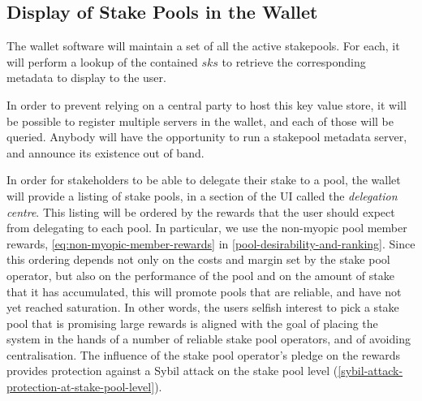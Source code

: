 \documentclass[11pt,a4paper]{article}
\begin{document}
\subsection{Display of Stake Pools in the Wallet}
\label{display-of-stake-pools-in-the-wallet}

The wallet software will maintain a set of all the active stakepools. For each,
it will perform a lookup of the contained \(sks\) to retrieve the corresponding
metadata to display to the user.

In order to prevent relying on a central party to host this key value
store, it will be possible to register multiple servers in the wallet,
and each of those will be queried. Anybody will have the opportunity to
run a stakepool metadata server, and announce its existence out of
band.

In order for stakeholders to be able to delegate their stake to a pool,
the wallet will provide a listing of stake pools, in a section of the UI
called the \emph{delegation centre}. This listing will be ordered by
the rewards that the user should expect from delegating to each pool. In
particular, we use the non-myopic pool member rewards,
\cref{eq:non-myopic-member-rewards} in \cref{pool-desirability-and-ranking}.
Since this ordering depends not only on the costs and margin set
by the stake pool operator, but also on the performance of the pool and
on the amount of stake that it has accumulated, this will promote pools
that are reliable, and have not yet reached saturation. In other words,
the users selfish interest to pick a stake pool that is promising large
rewards is aligned with the goal of placing the system in the hands of a
number of reliable stake pool operators, and of avoiding centralisation.
The influence of the stake pool operator's pledge on the rewards
provides protection against a Sybil attack on the stake pool level
(\cref{sybil-attack-protection-at-stake-pool-level}).
\end{document}
